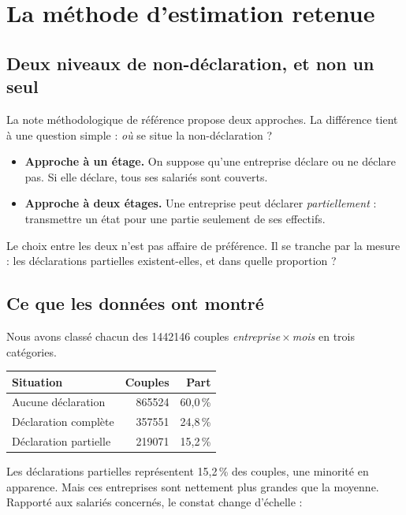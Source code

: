 \documentclass[11pt,a4paper]{article}
\begin{document}
\section{La méthode d'estimation retenue}

\subsection{Deux niveaux de non-déclaration, et non un seul}

La note méthodologique de référence propose deux approches. La différence
tient à une question simple : \emph{où} se situe la non-déclaration ?

\begin{itemize}[leftmargin=1.4em]
  \item \textbf{Approche à un étage.} On suppose qu'une entreprise déclare
  ou ne déclare pas. Si elle déclare, tous ses salariés sont couverts.
  \item \textbf{Approche à deux étages.} Une entreprise peut déclarer
  \emph{partiellement} : transmettre un état pour une partie seulement de
  ses effectifs.
\end{itemize}

Le choix entre les deux n'est pas affaire de préférence. Il se tranche par
la mesure : les déclarations partielles existent-elles, et dans quelle
proportion ?

\subsection{Ce que les données ont montré}

Nous avons classé chacun des \num{1442146} couples
\emph{entreprise\,$\times$\,mois} en trois catégories.

\begin{center}
\begin{tabular}{lrr}
\toprule
\textbf{Situation} & \textbf{Couples} & \textbf{Part} \\
\midrule
Aucune déclaration & \num{865524} & 60,0\,\% \\
Déclaration complète & \num{357551} & 24,8\,\% \\
Déclaration partielle & \num{219071} & 15,2\,\% \\
\bottomrule
\end{tabular}
\end{center}

Les déclarations partielles représentent 15,2\,\% des couples, une
minorité en apparence. Mais ces entreprises sont nettement plus grandes
que la moyenne. Rapporté aux salariés concernés, le constat change
d'échelle :
\end{document}
